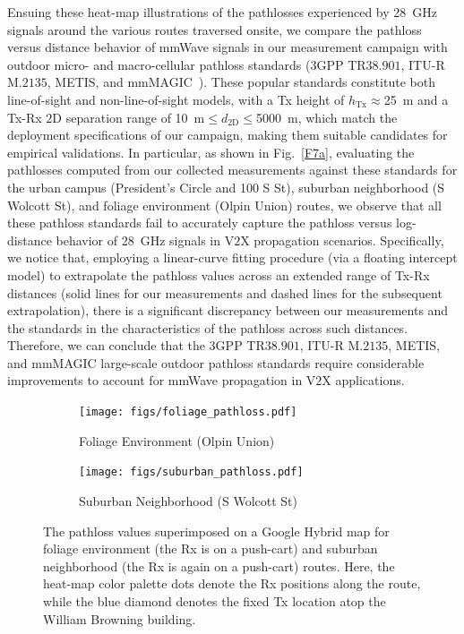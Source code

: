 \documentclass[12pt, draftcls, onecolumn]{IEEEtran}
\begin{document}
{Ensuing these heat-map illustrations of the pathlosses experienced by \SI{28}{\giga\hertz} signals around the various routes traversed onsite, we compare the pathloss versus distance behavior of mmWave signals in our measurement campaign with outdoor micro- and macro-cellular pathloss standards ($3$GPP TR$38.901$, ITU-R M$.2135$, METIS, and mmMAGIC~\cite{MacCartneyModelsOverview}). These popular standards constitute both line-of-sight and non-line-of-sight models, with a Tx height of $h_{\text{Tx}}{\approx}$\SI{25}{\meter} and a Tx-Rx $2$D separation range of \SI{10}{\meter}${\leq}d_{2\text{D}}{\leq}$\SI{5000}{\meter}, which match the deployment specifications of our campaign, making them suitable candidates for empirical validations. In particular, as shown in Fig.~\ref{F7a}, evaluating the pathlosses computed from our collected measurements against these standards for the urban campus (President's Circle and 100 S St), suburban neighborhood (S Wolcott St), and foliage environment (Olpin Union) routes, we observe that all these pathloss standards fail to accurately capture the pathloss versus log-distance behavior of \SI{28}{\giga\hertz} signals in V$2$X propagation scenarios. Specifically, we notice that, employing a linear-curve fitting procedure (via a floating intercept model) to extrapolate the pathloss values across an extended range of Tx-Rx distances (solid lines for our measurements and dashed lines for the subsequent extrapolation), there is a significant discrepancy between our measurements and the standards in the characteristics of the pathloss across such distances. Therefore, we can conclude that the $3$GPP TR$38.901$, ITU-R M$.2135$, METIS, and mmMAGIC large-scale outdoor pathloss standards require considerable improvements to account for mmWave propagation in V$2$X applications.
\begin{figure} [t]
     \centering
     \begin{subfigure}{0.557\linewidth}
         \centering
         \texttt{[image: figs/foliage\_pathloss.pdf]}
         \caption{Foliage Environment (Olpin Union)}
         \label{F6a}
     \end{subfigure}
     \begin{subfigure}{0.433\linewidth}
         \centering
         \texttt{[image: figs/suburban\_pathloss.pdf]}
         \caption{Suburban Neighborhood (S Wolcott St)}
         \label{F6b}
     \end{subfigure}
     \vspace{-8mm}
     \caption{The pathloss values superimposed on a Google Hybrid map for foliage environment (the Rx is on a push-cart) and suburban neighborhood (the Rx is again on a push-cart) routes. Here, the heat-map color palette dots denote the Rx positions along the route, while the blue diamond denotes the fixed Tx location atop the William Browning building.}
     \label{F6}
\end{figure}

}
\end{document}
